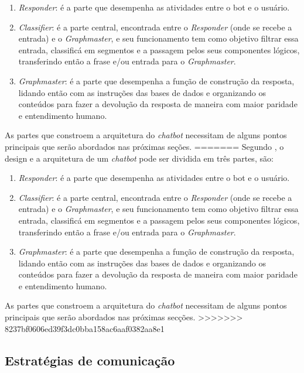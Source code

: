 \documentclass[
	12pt,				%
	oneside,
	a4paper,			%
	english,			%
	french,				%
	spanish,			%
	brazil				%
	]{abntex2}
\begin{document}
\begin{enumerate}

        \item \emph{Responder}: é a parte que desempenha as atividades entre o bot e o usuário.
        \item \emph{Classifier}: é a parte central, encontrada entre o \emph{Responder} (onde se recebe a entrada) e o \emph{Graphmaster}, e seu funcionamento tem como objetivo filtrar essa entrada, classificá em segmentos e a passagem pelos seus componentes lógicos, transferindo então a frase e/ou entrada para o \emph{Graphmaster}.
        \item \emph{Graphmaster}: é a parte que desempenha a função de construção da resposta, lidando então com as instruções das bases de dados e organizando os conteúdos para fazer a devolução da resposta de maneira com maior paridade e entendimento humano.
\end{enumerate}

As partes que constroem a arquitetura do \emph{chatbot} necessitam de alguns pontos principais que serão abordados nas próximas seções.
=======
Segundo \textcite{Abdul-Kader2015}, o design e a arquitetura de um \emph{chatbot} pode ser dividida em três partes, são:

\begin{enumerate}
	\item \emph{Responder}: é a parte que desempenha as atividades entre o bot e o usuário.
	\item \emph{Classifier}: é a parte central, encontrada entre o \emph{Responder} (onde se recebe a entrada) e o \emph{Graphmaster}, e seu funcionamento tem como objetivo filtrar essa entrada, classificá em segmentos e a passagem pelos seus componentes lógicos, transferindo então a frase e/ou entrada para o \emph{Graphmaster}.
	\item \emph{Graphmaster}: é a parte que desempenha a função de construção da resposta, lidando então com as instruções das bases de dados e organizando os conteúdos para fazer a devolução da resposta de maneira com maior paridade e entendimento humano.
\end{enumerate}

As partes que constroem a arquitetura do \emph{chatbot} necessitam de alguns pontos principais que serão abordados nas próximas secções.
>>>>>>> 8237bf0606ed39f3dc0bba158ac6aaf0382aa8e1

\subsection{Estratégias de comunicação}
\end{document}
